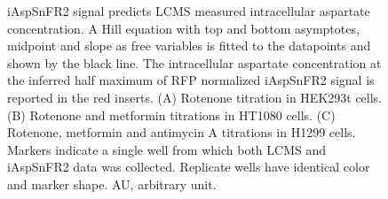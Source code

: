 \documentclass[9pt,lineno]{elife}
\begin{document}
\begin{figure}[ht!]
\centering
{}
\caption{
iAspSnFR2 signal predicts LCMS measured intracellular aspartate concentration.
A Hill equation with top and bottom asymptotes, midpoint and slope as free variables is fitted to the datapoints and shown by the black line.
The intracellular aspartate concentration at the inferred half maximum of RFP normalized iAspSnFR2 signal is reported in the red inserts.
(A) Rotenone titration in HEK293t cells.
(B) Rotenone and metformin titrations in HT1080 cells.
(C) Rotenone, metformin and antimycin A titrations in H1299 cells.
Markers indicate a single well from which both LCMS and iAspSnFR2 data was collected.
Replicate wells have identical color and marker shape.
AU, arbitrary unit.
}
\label{fig:Fig3}
\label{figsupp:f3S1}
\end{figure}
\end{document}
